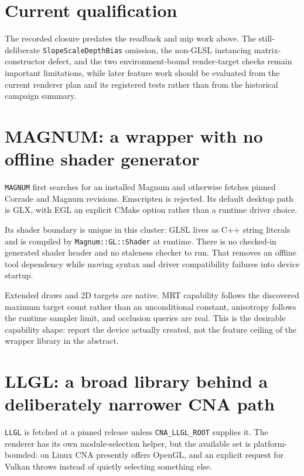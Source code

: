 \section{Current qualification}

The recorded closure predates the readback and mip work above. The still-deliberate
\texttt{SlopeScaleDepthBias} omission, the non-GLSL instancing matrix-constructor defect, and
the two environment-bound render-target checks remain important limitations, while later
feature work should be evaluated from the current renderer plan and its registered tests rather
than from the historical campaign summary.

\section{MAGNUM: a wrapper with no offline shader generator}

\texttt{MAGNUM} first searches for an installed Magnum and otherwise fetches pinned Corrade
and Magnum revisions.  Emscripten is rejected.  Its default desktop path is GLX, with EGL an
explicit CMake option rather than a runtime driver choice.

Its shader boundary is unique in this cluster: GLSL lives as C++ string literals and is
compiled by \texttt{Magnum::GL::Shader} at runtime.  There is no checked-in generated shader
header and no staleness checker to run.  That removes an offline tool dependency while moving
syntax and driver compatibility failures into device startup.

Extended draws and 2D targets are native.  MRT capability follows the discovered maximum
target count rather than an unconditional constant, anisotropy follows the runtime sampler
limit, and occlusion queries are real.  This is the desirable capability shape: report the
device actually created, not the feature ceiling of the wrapper library in the abstract.

\section{LLGL: a broad library behind a deliberately narrower CNA path}

\texttt{LLGL} is fetched at a pinned release unless \texttt{CNA\_LLGL\_ROOT} supplies it.
The renderer has its own module-selection helper, but the available set is platform-bounded:
on Linux CNA presently offers OpenGL, and an explicit request for Vulkan throws instead of
quietly selecting something else.

